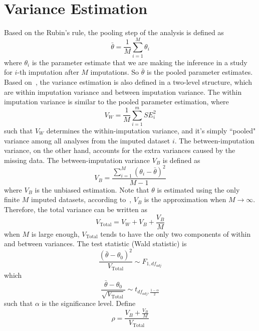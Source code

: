 \documentclass[preprint,12pt]{elsarticle}
\begin{document}
\section{Variance Estimation} 
Based on the Rubin's rule, the pooling step of the analysis is defined as 
\begin{equation} 
    \bar{\theta}=\frac{1}{M}\sum_{i=1}^M\theta_i
\end{equation}
where $\theta_i$ is the parameter estimate that we are making the inference in a study for $i$-th imputation after $M$ imputations. 
So $\bar{\theta}$ is the pooled parameter estimates. 
Based on~\citet{barnard1999miscellanea}, the variance estimation is also defined in a two-level structure, which are within imputation variance and between imputation variance. 
The within imputation variance is similar to the pooled parameter estimation, where 
\begin{equation} 
    V_W=\frac{1}{M}\sum_{i=1}^mSE_i^2
\end{equation}
such that $V_W$ determines the within-imputation variance, and it's simply ``pooled" variance among all analyses from the imputed dataset $i$. 
The between-imputation variance, on the other hand, accounts for the extra variances caused by the missing data. 
The between-imputation variance $V_B$ is defined as 
\begin{equation} 
    V_B=\frac{\sum_{i=1}^M(\theta_i-\bar{\theta})^2}{M-1}
\end{equation}
where $V_B$ is the unbiased estimation. 
Note that $\theta$ is estimated using the only finite $M$ imputed datasets, according to~\citet{van2018flexible}, $V_B$ is the approximation when $M\rightarrow\infty$.
Therefore, the total variance can be written as
\begin{equation} 
    V_{\text{Total}}=V_W+V_B+\frac{V_B}{M}
\end{equation}
when $M$ is large enough, $V_{\text{Total}}$ tends to have the only two components of within and between variances. 
The test statistic (Wald statistic) is 
\begin{equation} 
    \frac{(\bar{\theta}-\theta_0)^2}{V_{\text{Total}}}\sim F_{1,df_{adj}}
\end{equation}
which 
\begin{equation} 
    \frac{\bar{\theta}-\theta_0}{\sqrt{V_{\text{Total}}}}\sim t_{df_{adj}, \frac{1-\alpha}{2}}
\end{equation}
such that $\alpha$ is the significance level. 
Define 
\begin{equation}
    \rho=\frac{V_B+\frac{V_B}{M}}{V_{\text{Total}}}
\end{equation}
\end{document}
